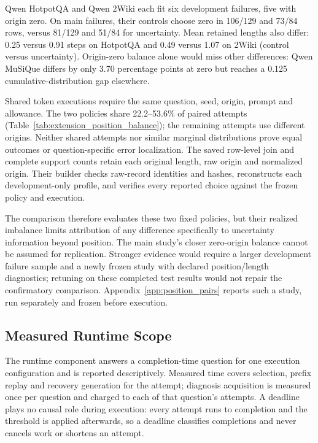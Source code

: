 \documentclass{article}
\begin{document}
Qwen HotpotQA and Qwen 2Wiki each fit six development failures, five with
origin zero. On main failures, their controls choose zero in 106/129 and
73/84 rows, versus 81/129 and 51/84 for uncertainty. Mean retained lengths
also differ: 0.25 versus 0.91 steps on HotpotQA and 0.49 versus 1.07 on
2Wiki (control versus uncertainty). Origin-zero balance alone would miss
other differences: Qwen MuSiQue differs by only 3.70 percentage points at
zero but reaches a 0.125 cumulative-distribution gap elsewhere.

Shared token executions require the same question, seed, origin, prompt
and allowance. The two policies share 22.2--53.6\% of paired attempts
(Table~\ref{tab:extension_position_balance}); the remaining attempts use
different origins. Neither shared attempts nor similar marginal
distributions prove equal outcomes or question-specific error localization.
The saved row-level join and complete support counts retain each original
length, raw origin and normalized origin. Their builder checks raw-record
identities and hashes, reconstructs each development-only profile, and
verifies every reported choice against the frozen policy and execution.

The comparison therefore evaluates these two fixed policies, but their
realized imbalance limits attribution of any difference specifically to
uncertainty information beyond position. The main study's closer zero-origin
balance cannot be assumed for replication. Stronger evidence would require
a larger development failure sample and a newly frozen study with declared
position/length diagnostics; retuning on these completed test results would
not repair the confirmatory comparison. Appendix~\ref{app:position_pairs}
reports such a study, run separately and frozen before execution.

\subsection{Measured Runtime Scope}
\label{app:runtime_scope}
The runtime component answers a completion-time question for one execution
configuration and is reported descriptively. Measured time covers selection,
prefix replay and recovery generation for the attempt; diagnosis acquisition
is measured once per question and charged to each of that question's
attempts. A deadline plays no causal role during execution: every attempt
runs to completion and the threshold is applied afterwards, so a deadline
classifies completions and never cancels work or shortens an attempt.
\end{document}
